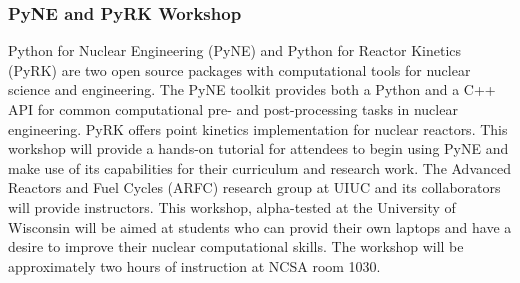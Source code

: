 \subsubsection{PyNE and PyRK Workshop}
Python for Nuclear Engineering (PyNE) and Python for Reactor Kinetics (PyRK) are two open source packages with computational tools for nuclear science and engineering. The PyNE toolkit provides both a Python and a C++ API for common computational pre- and post-processing tasks in nuclear engineering. PyRK offers point kinetics implementation for nuclear reactors. This workshop will provide a hands-on tutorial for attendees to begin using PyNE and make use of its capabilities for their curriculum and research work. The Advanced Reactors and Fuel Cycles (ARFC) research group at UIUC and its collaborators will provide instructors. This workshop, alpha-tested at the University of Wisconsin will be aimed at students who can provid their own laptops and have a desire to improve their nuclear computational skills. The workshop will be approximately two hours of instruction at NCSA room 1030.


